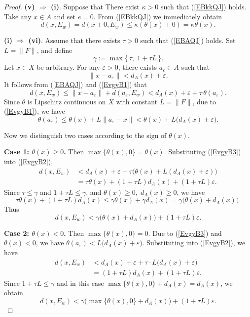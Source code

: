 \documentclass[11pt]{article}
\begin{document}
\begin{proof}
	\noindent\textbf{(v) $\Rightarrow$ (i)}.
Suppose  that There exist \(\kappa > 0\) such that  (\ref{EBkkQJ}) holds.   
Take any \(x \in A\) and set \(e = 0\). From (\ref{EBkkQJ}) we immediately obtain
\[
d(x, E_w) = d(x+0, E_w) \le \kappa (\theta(x) + 0) = \kappa \theta(x).
\]
 
 
	\noindent\textbf{(i) $\Rightarrow$ (vi)}.
Assume  that   there exists $\tau>0$ such that  (\ref{EBAQJ}) holds.
Set $L=\|F\|$, and define
\[
\gamma := \max\{\,\tau,\;1+\tau L\,\}.
\]
Let  $x\in X$      be arbitrary.   For   any    $\varepsilon>0$,  there exists $a_\varepsilon\in A$ such that
 \begin{equation}\label{EvgyB1}	\|x-a_\varepsilon\| < d_A(x)+\varepsilon  .        
 \end{equation}
 It follows from    (\ref{EBAQJ})   and  (\ref{EvgyB1})    that   
 \begin{equation}\label{EvgyB2}
 	d(x,E_w) \le \|x-a_\varepsilon\| + d(a_\varepsilon,E_w) < d_A(x)+\varepsilon + \tau\,\theta(a_\varepsilon) .
 \end{equation}
Since  \(\theta\) is Lipschitz continuous on \(X\) with constant \(L = \|F\|\),  due to (\ref{EvgyB1}),  we have
\begin{equation} \label{EvgyB3}
	\theta(a_\varepsilon) \le \theta(x) + L\|a_\varepsilon-x\| 
	< \theta(x) + L\bigl(d_A(x)+\varepsilon\bigr).  
\end{equation}

Now we distinguish two cases according to the sign of $\theta(x)$.

\noindent\textbf{Case 1: $\theta(x)\ge 0$.}
Then $\max\{\theta(x),0\}=\theta(x)$. Substituting (\ref{EvgyB3}) into (\ref{EvgyB2}),
\[
\begin{aligned}
	d(x,E_w) &< d_A(x)+\varepsilon + \tau\bigl(\theta(x)+L(d_A(x)+\varepsilon)\bigr) \\
	&= \tau\theta(x) + (1+\tau L)d_A(x) + (1+\tau L)\varepsilon.
\end{aligned}
\]
Since $\tau\le\gamma$ and $1+\tau L\le\gamma$, and $\theta(x)\ge0,\;d_A(x)\ge0$, we have
\[
\tau\theta(x) + (1+\tau L)d_A(x) \le \gamma\theta(x) + \gamma d_A(x) = \gamma\bigl(\theta(x)+d_A(x)\bigr).
\]
Thus
\[
d(x,E_w) < \gamma\bigl(\theta(x)+d_A(x)\bigr) + (1+\tau L)\varepsilon.
\]

\noindent\textbf{Case 2: $\theta(x)<0$.}
Then $\max\{\theta(x),0\}=0$. Due to (\ref{EvgyB3})  and   $\theta(x)<0$, we have
$\theta(a_\varepsilon) < L\bigl(d_A(x)+\varepsilon\bigr)$.
Substituting into (\ref{EvgyB2}), we have
\[
\begin{aligned}
	d(x,E_w) &< d_A(x)+\varepsilon + \tau \cdot L\bigl(d_A(x)+\varepsilon\bigr) \\
	&= (1+\tau L)d_A(x) + (1+\tau L)\varepsilon.
\end{aligned}
\]
Since $1+\tau L\le\gamma$ and in this case $\max\{\theta(x),0\}+d_A(x)=d_A(x)$, we obtain
\[
d(x,E_w) < \gamma\bigl(\max\{\theta(x),0\}+d_A(x)\bigr) + (1+\tau L)\varepsilon.
\]


\end{proof}
\end{document}

